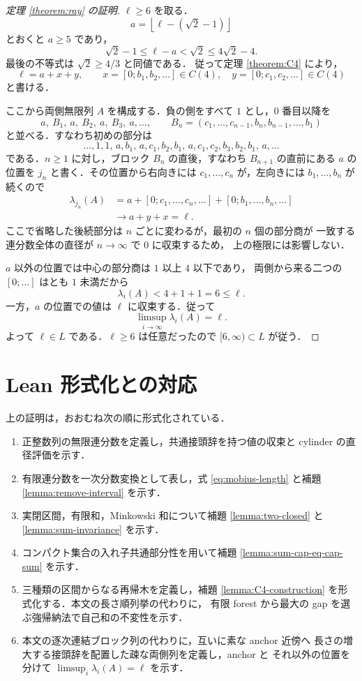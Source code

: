 \documentclass[10pt,a4paper]{ujarticle}
\begin{document}
\begin{proof}[定理 \ref{theorem:ray} の証明]
$\ell\ge6$ を取る．
\[
  a=\left\lfloor\ell-(\sqrt2-1)\right\rfloor
\]
とおくと $a\ge5$ であり，
\[
  \sqrt2-1
  \le \ell-a
  <\sqrt2
  \le4\sqrt2-4.
\]
最後の不等式は $\sqrt2\ge4/3$ と同値である．
従って定理 \ref{theorem:C4} により，
\[
  \ell=a+x+y,\qquad
  x=[0;b_1,b_2,\ldots]\in C(4),\quad
  y=[0;c_1,c_2,\ldots]\in C(4)
\]
と書ける．

ここから両側無限列 $A$ を構成する．負の側をすべて $1$ とし，$0$ 番目以降を
\[
  a,\ B_1,\ a,\ B_2,\ a,\ B_3,\ a,\ldots,
  \qquad
  B_n=(c_1,\ldots,c_{n-1},b_n,b_{n-1},\ldots,b_1)
\]
と並べる．すなわち初めの部分は
\[
  \ldots,1,1,\,
  a,b_1,\,
  a,c_1,b_2,b_1,\,
  a,c_1,c_2,b_3,b_2,b_1,\,
  a,\ldots
\]
である．$n\ge1$ に対し，ブロック $B_n$ の直後，すなわち
$B_{n+1}$ の直前にある $a$ の位置を $j_n$ と書く．その位置から右向きには
$c_1,\ldots,c_n$ が，左向きには $b_1,\ldots,b_n$ が続くので
\begin{align*}
  \lambda_{j_n}(A)
  &=
  a+[0;c_1,\ldots,c_n,\ldots]
  +[0;b_1,\ldots,b_n,\ldots]\\
  &\longrightarrow a+y+x=\ell.
\end{align*}
ここで省略した後続部分は $n$ ごとに変わるが，最初の $n$ 個の部分商が
一致する連分数全体の直径が $n\to\infty$ で $0$ に収束するため，
上の極限には影響しない．

$a$ 以外の位置では中心の部分商は $1$ 以上 $4$ 以下であり，
両側から来る二つの $[0;\ldots]$ はとも $1$ 未満だから
\[
  \lambda_i(A)<4+1+1=6\le\ell.
\]
一方，$a$ の位置での値は $\ell$ に収束する．従って
\[
  \limsup_{i\to\infty}\lambda_i(A)=\ell.
\]
よって $\ell\in L$ である．$\ell\ge6$ は任意だったので
$[6,\infty)\subset L$ が従う．
\end{proof}

\section{Lean 形式化との対応}

上の証明は，おおむね次の順に形式化されている．
\begin{enumerate}
  \item 正整数列の無限連分数を定義し，共通接頭辞を持つ値の収束と
        cylinder の直径評価を示す．
  \item 有限連分数を一次分数変換として表し，式
        \eqref{eq:mobius-length} と補題 \ref{lemma:remove-interval} を示す．
  \item 実閉区間，有限和，Minkowski 和について補題
        \ref{lemma:two-closed} と \ref{lemma:sum-invariance} を示す．
  \item コンパクト集合の入れ子共通部分性を用いて補題
        \ref{lemma:sum-cap-eq-cap-sum} を示す．
  \item 三種類の区間からなる再帰木を定義し，補題
        \ref{lemma:C4-construction} を形式化する．本文の長さ順列挙の代わりに，
        有限 forest から最大の gap を選ぶ強帰納法で自己和の不変性を示す．
  \item 本文の逐次連結ブロック列の代わりに，互いに素な anchor 近傍へ
        長さの増大する接頭辞を配置した疎な両側列を定義し，anchor と
        それ以外の位置を分けて $\limsup_i\lambda_i(A)=\ell$ を示す．
\end{enumerate}
\end{document}
